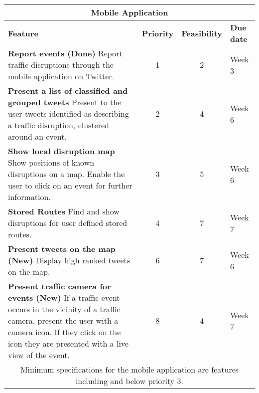 \begin{center}
\begin{tabular}{ | p{9cm} | c | c | p{1.8cm} | }
\hline
\multicolumn{4}{|c|}{\textbf{Mobile Application}} \\ \hline
\textbf{Feature} & \textbf{Priority} & \textbf{Feasibility} & \textbf{Due date} \\ \hline
\textbf{Report events (Done)}\newline
Report traffic disruptions through the mobile application on Twitter. & 1 & 2 & Week 3 \\ \hline
\textbf{Present a list of classified and grouped tweets}\newline
Present to the user tweets identified as describing a traffic disruption,
clustered around an event. & 2 & 4 & Week 6 \\ \hline
\textbf{Show local disruption map}\newline
Show positions of known disruptions on a map. Enable the user to click on an event for further information. & 3 & 5 & Week 6 \\ \hline
\textbf{Stored Routes}\newline
Find and show disruptions for user defined stored routes. & 4 & 7 & Week 7 \\ \hline
\textbf{Present tweets on the map (New)}\newline
Display high ranked tweets on the map.& 6 & 7 & Week 6 \\ \hline
\textbf{Present traffic camera for events (New)}\newline
If a traffic event occurs in the vicinity of a traffic camera, present the user
with a camera icon. If they click on the icon they are presented with a live
view of the event. &  8 & 4 & Week 7 \\ \hline
\multicolumn{4}{|c|}{Minimum specifications for the mobile application are
features including and below priority 3.} \\ \hline
\end{tabular}
\end{center}

